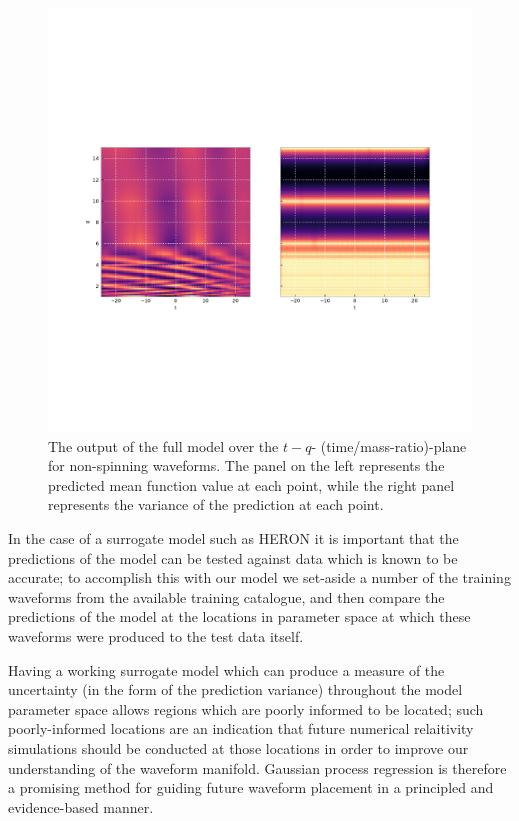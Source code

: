 \documentclass[openleft]{kentigern}
\theoremstyle{definition}
\begin{document}
\begin{figure}
  \includegraphics[width=\textwidth, trim={1cm 6cm 2cm 7cm},clip]{figures/heron/monster_qplane.pdf}
  \caption{The output of the full \heron{} model over the $t-q$-
    (time/mass-ratio)-plane for non-spinning waveforms. The panel on
    the left represents the predicted mean function value at each
    point, while the right panel represents the variance of the
    prediction at each point. \label{fig:qtplane}}
\end{figure}

In the case of a surrogate model such as HERON it is important that
the predictions of the model can be tested against data which is known
to be accurate; to accomplish this with our model we set-aside a
number of the training waveforms from the available training
catalogue, and then compare the predictions of the model at the
locations in parameter space at which these waveforms were produced to
the test data itself.

Having a working surrogate model which can produce a measure of the
uncertainty (in the form of the prediction variance) throughout the
model parameter space allows regions which are poorly informed to be
located; such poorly-informed locations are an indication that future
numerical relaitivity simulations should be conducted at those
locations in order to improve our understanding of the waveform
manifold. Gaussian process regression is therefore a promising method
for guiding future waveform placement in a principled and
evidence-based manner. 
\end{document}
